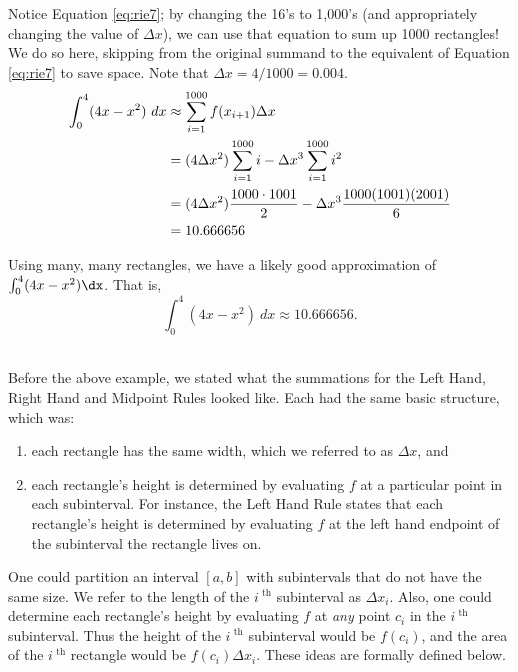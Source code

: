 {Notice  Equation \eqref{eq:rie7}; by changing the 16's to 1,000's (and appropriately changing the value of $\Delta x$), we can use that equation to sum up 1000 rectangles!
{}
We do so here, skipping from the original summand to the equivalent of Equation \eqref{eq:rie7} to save space. Note that $\Delta x = 4/1000 = 0.004$.
\begin{align}
\int_0^4 (4x-x^2)\ dx &\approx \sum_{i=1}^{1000} f(x_{i+1})\Delta x \notag\\
									&= (4\Delta x^2)\sum_{i=1}^{1000} i - \Delta x^3 \sum_{i=1}^{1000} i^2 \notag\\
									&= (4\Delta x^2)\frac{1000\cdot 1001}{2} - \Delta x^3 \frac{1000(1001)(2001)}6 \notag\\
									&=10.666656\notag
\end{align}

Using many, many rectangles, we have a likely good approximation of $\int_0^4 (4x-x^2)\dx$. That is, $$\int_0^4(4x-x^2)\ dx \approx 10.666656.$$
\baselineskip
}\\

Before the above example, we stated what the summations for the Left Hand, Right Hand and Midpoint Rules looked like. Each had the same basic structure, which was:
\begin{enumerate}
	\item each rectangle has the same width, which we referred to as $\Delta x$, and
	\item	each rectangle's height is determined by evaluating $f$ at a particular point in each subinterval. For instance, the Left Hand Rule states that each rectangle's height is determined by evaluating $f$ at the left hand endpoint of the subinterval the rectangle lives on.
\end{enumerate}
One could partition an interval $[a,b]$ with subintervals that do not have the same size. We refer to the length of the %
$i^\text{ th}$ subinterval as $\Delta x_i$. Also, one could determine each rectangle's height by evaluating $f$ at \emph{any} point $c_i$ in the $i^\text{ th}$ subinterval. %
Thus the height of the $i^\text{ th}$ subinterval would be $f(c_i)$, and the area of the $i^\text{ th}$ rectangle would be $f(c_i)\Delta x_i$. These ideas are formally defined below.
\enlargethispage{4\baselineskip}

